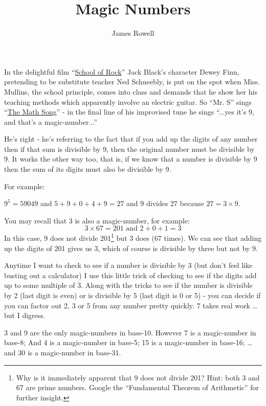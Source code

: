 \documentclass{article}
\title{Magic Numbers}
\author{James Rowell}
\newenvironment{jprIn}{\begin{adjustwidth}{2em}{}}{\end{adjustwidth}}
\begin{document}
\maketitle

In the delightful film ``\href{https://en.wikipedia.org/wiki/School_of_Rock}{School of Rock}'' Jack Black's character Dewey Finn,
pretending to be substitute teacher Ned Schneebly, is put on the spot when
Miss. Mullins, the school principle, comes into class and demands that he show
her his teaching methods which apparently involve an electric guitar.
So ``Mr. S'' sings ``\href{https://www.youtube.com/watch?v=aa8U0nL-KXg}{The Math Song}'' - in the final line of his
improvised tune he sings ``...yes it's 9, and that's a magic-number...''

He's right - he's referring to the fact that if you add up the digits of
any number then if that sum is divisible by 9, then the original number
must be divisible by 9. It works the other way too, that is, if we know
that a number is divisible by 9 then the sum of its digits must also be
divisible by 9.

For example:
\begin{jprIn}
$9^5=59049$ and $5+9+0+4+9=27$ and 9 divides 27 because $27 = 3\times{}9$.
\end{jprIn}

You may recall that 3 is also a magic-number, for example:
\[ 3\times{}67=201 \text{ and } 2+0+1=3\]
In this case, 9 does not divide 201\footnote{Why is it immediately apparent that 9 does not divide 201? Hint: both 3 and 67 are prime numbers.
Google the ``Fundamental Theorem of Arithmetic'' for further insight.}
but 3 does (67 times).
We can see that adding up the digits of 201 gives us 3, which of course is divisible by three but not by 9.

Anytime I want to check to see if a number is divisible by 3 (but don't feel like busting out a calculator)
I use this little trick of checking to see if the digits add up to some multiple of 3. Along with the tricks to see if the number is divisible by 2 (last digit is even) or is divisible 
by 5 (last digit is 0 or 5) - you can decide if you can factor out 2, 3 or 5 from any number pretty quickly.  7 takes real work \dots{}but I digress.

3 and 9 are the only magic-numbers in base-10.
However 7 is a magic-number in base-8;
And 4 is a magic-number in base-5;
15 is a magic-number in base-16;
\dots{}and 30 is a magic-number in base-31.
\end{document}
